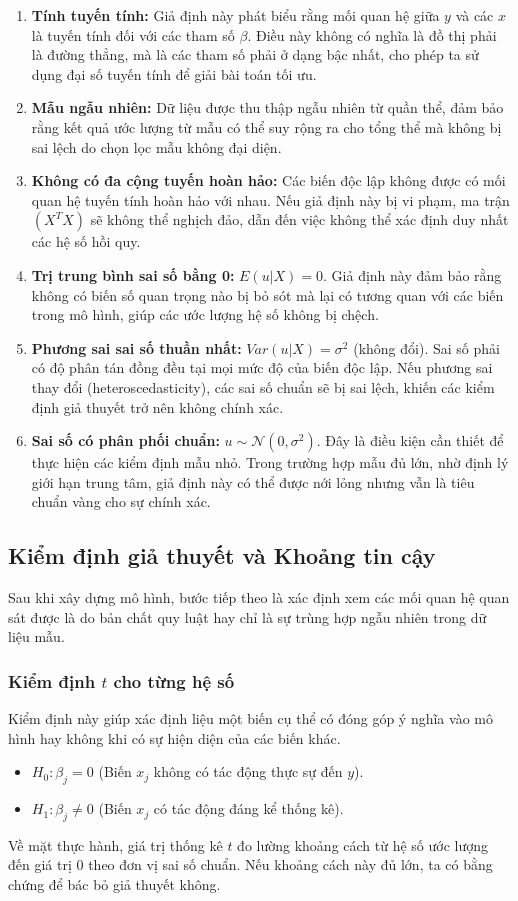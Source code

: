 \begin{enumerate}
    \item \textbf{Tính tuyến tính:} Giả định này phát biểu rằng mối quan hệ giữa $y$ và các $x$ là tuyến tính đối với các tham số $\beta$. Điều này không có nghĩa là đồ thị phải là đường thẳng, mà là các tham số phải ở dạng bậc nhất, cho phép ta sử dụng đại số tuyến tính để giải bài toán tối ưu.
    \item \textbf{Mẫu ngẫu nhiên:} Dữ liệu được thu thập ngẫu nhiên từ quần thể, đảm bảo rằng kết quả ước lượng từ mẫu có thể suy rộng ra cho tổng thể mà không bị sai lệch do chọn lọc mẫu không đại diện.
    \item \textbf{Không có đa cộng tuyến hoàn hảo:} Các biến độc lập không được có mối quan hệ tuyến tính hoàn hảo với nhau. Nếu giả định này bị vi phạm, ma trận $(X^T X)$ sẽ không thể nghịch đảo, dẫn đến việc không thể xác định duy nhất các hệ số hồi quy.
    \item \textbf{Trị trung bình sai số bằng 0:} $E(u|X) = 0$. Giả định này đảm bảo rằng không có biến số quan trọng nào bị bỏ sót mà lại có tương quan với các biến trong mô hình, giúp các ước lượng hệ số không bị chệch.
    \item \textbf{Phương sai sai số thuần nhất:} $Var(u|X) = \sigma^2$ (không đổi). Sai số phải có độ phân tán đồng đều tại mọi mức độ của biến độc lập. Nếu phương sai thay đổi (heteroscedasticity), các sai số chuẩn sẽ bị sai lệch, khiến các kiểm định giả thuyết trở nên không chính xác.
    \item \textbf{Sai số có phân phối chuẩn:} $u \sim \mathcal{N}(0, \sigma^2)$. Đây là điều kiện cần thiết để thực hiện các kiểm định mẫu nhỏ. Trong trường hợp mẫu đủ lớn, nhờ định lý giới hạn trung tâm, giả định này có thể được nới lỏng nhưng vẫn là tiêu chuẩn vàng cho sự chính xác.
\end{enumerate}

\subsection{Kiểm định giả thuyết và Khoảng tin cậy}

Sau khi xây dựng mô hình, bước tiếp theo là xác định xem các mối quan hệ quan sát được là do bản chất quy luật hay chỉ là sự trùng hợp ngẫu nhiên trong dữ liệu mẫu.

\subsubsection{Kiểm định $t$ cho từng hệ số}
Kiểm định này giúp xác định liệu một biến cụ thể có đóng góp ý nghĩa vào mô hình hay không khi có sự hiện diện của các biến khác.
\begin{itemize}
    \item $H_0: \beta_j = 0$ (Biến $x_j$ không có tác động thực sự đến $y$).
    \item $H_1: \beta_j \neq 0$ (Biến $x_j$ có tác động đáng kể thống kê).
\end{itemize}
Về mặt thực hành, giá trị thống kê $t$ đo lường khoảng cách từ hệ số ước lượng đến giá trị 0 theo đơn vị sai số chuẩn. Nếu khoảng cách này đủ lớn, ta có bằng chứng để bác bỏ giả thuyết không.

